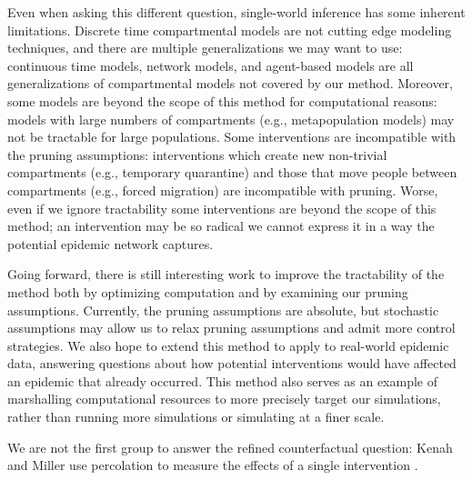 \documentclass[PTRSB]{rsos}
\begin{document}
\begin{multicols}{2}
Even when asking this different question, single-world inference has some inherent limitations.
Discrete time compartmental models are not cutting edge modeling techniques, and there are multiple generalizations we may want to use: continuous time models, network models, and agent-based models are all generalizations of compartmental models not covered by our method.
Moreover, some models are beyond the scope of this method for computational reasons: models with large numbers of compartments (e.g., metapopulation models) may not be tractable for large populations.
Some interventions are incompatible with the pruning assumptions: interventions which create new non-trivial compartments (e.g., temporary quarantine) and those that move people between compartments (e.g., forced migration) are incompatible with pruning.
Worse, even if we ignore tractability some interventions are beyond the scope of this method; an intervention may be so radical we cannot express it in a way the potential epidemic network captures.

Going forward, there is still interesting work to improve the tractability of the method both by optimizing computation and by examining our pruning assumptions.
Currently, the pruning assumptions are absolute, but stochastic assumptions may allow us to relax pruning assumptions and admit more control strategies.
We also hope to extend this method to apply to real-world epidemic data, answering questions about how potential interventions would have affected an epidemic that already occurred.
This method also serves as an example of marshalling computational resources to more precisely target our simulations, rather than running more simulations or simulating at a finer scale.

We are not the first group to answer the refined counterfactual question: Kenah and Miller use percolation to measure the effects of a single intervention \cite{kenah-miller:2011}.
\enlargethispage{20pt}






\end{multicols}


\begin{multicols}{3}

\end{multicols}
\end{document}
